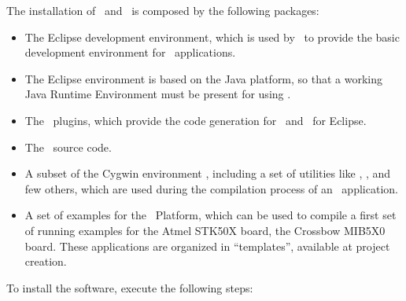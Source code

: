 The installation of \ee\ and \rtd\ is composed by the following
packages:
\begin{itemize}
\item The Eclipse development environment, which is used by \rtd\ to
  provide the basic development environment for \ee\ applications.
\item The Eclipse environment is based on the Java platform, so that
  a working Java Runtime Environment must be present for using \rtd.
\item The \rtd\ plugins, which provide the code generation for \ee\
  and \ee\ for Eclipse.
\item The \ee\ source code.
\item A subset of the Cygwin environment \cite{cygwin}, including
  a set of utilities like \file{make}, \file{gawk}, and few others, which
  are used during the compilation process of an \ee\ application.
\item A set of examples for the \avr\ Platform, which can be used to
  compile a first set of running examples for the Atmel STK50X board, the
  Crossbow MIB5X0 board. 
  These applications are organized in ``templates'', available at project 
  creation.
\end{itemize}

To install the software, execute the following steps:

